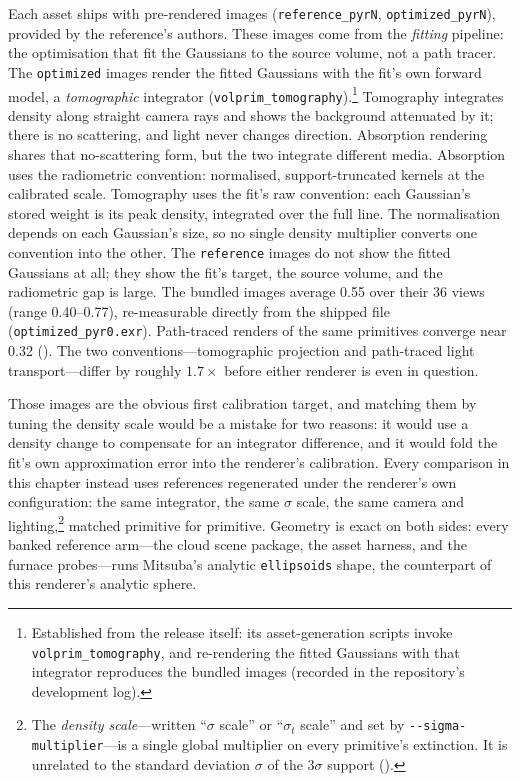 Each asset ships with pre-rendered images (\texttt{reference\_pyrN},
\texttt{optimized\_pyrN}), provided by the reference's authors. These images come from the
\emph{fitting} pipeline: the optimisation that fit the Gaussians to the source volume, not a
path tracer. The \texttt{optimized} images render the
fitted Gaussians with the fit's own forward model, a \emph{tomographic} integrator
(\texttt{volprim\_tomography}).\footnote{Established from the release itself: its
asset-generation scripts invoke \texttt{volprim\_tomography}, and re-rendering the fitted
Gaussians with that integrator reproduces the bundled images (recorded in the repository's
development log).}
Tomography integrates density along straight camera rays and shows the background
attenuated by it; there is no scattering, and light never changes direction. Absorption rendering shares that no-scattering form, but the two integrate different
media. Absorption uses the radiometric convention: normalised, support-truncated kernels
at the calibrated scale. Tomography uses the fit's raw convention: each Gaussian's stored
weight is its peak density, integrated over the full line. The normalisation depends
on each Gaussian's size, so no single density multiplier converts one convention into the
other. The \texttt{reference} images do not show the
fitted Gaussians at all; they show the fit's target, the source volume, and the radiometric
gap is large. The bundled images average \num{0.55} over their \num{36} views (range
\numrange{0.40}{0.77}), re-measurable directly from the shipped file
(\texttt{optimized\_pyr0.exr}). Path-traced renders of the same
primitives converge near \num{0.32} (). The two
conventions---tomographic projection and path-traced light transport---differ by roughly
$1.7\times$ before either renderer is even in question.

Those images are the obvious first calibration target, and matching them by tuning the
density scale would be a mistake for two reasons: it would use a density change to
compensate for an integrator difference, and it would fold the fit's own approximation
error into the renderer's calibration.
Every comparison in this chapter instead uses references regenerated under the renderer's own
configuration: the same integrator, the same $\sigma$ scale, the same camera and
lighting,\footnote{The \emph{density scale}---written ``$\sigma$ scale'' or ``$\sigma_t$
scale'' and set by \texttt{-{}-sigma-multiplier}---is a single global multiplier on every
primitive's extinction. It is unrelated to the standard deviation $\sigma$ of the
$3\sigma$ support ().}
matched primitive for primitive. Geometry is exact on both sides: every banked reference
arm---the cloud scene package, the asset harness, and the furnace probes---runs Mitsuba's
analytic \texttt{ellipsoids} shape, the counterpart of this renderer's analytic sphere.

